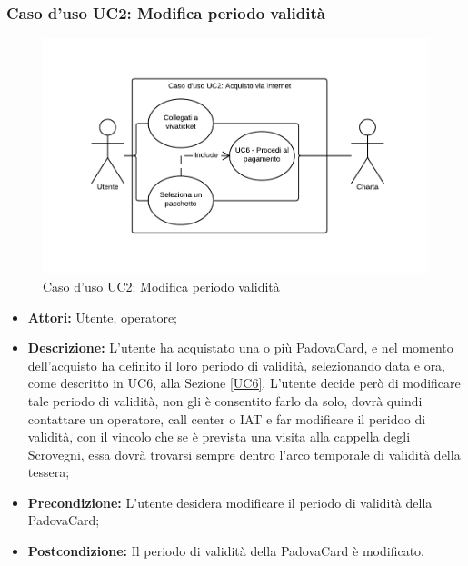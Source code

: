 \subsubsection{Caso d'uso UC2: Modifica periodo validità}
\begin{figure}[H]
\centering
\includegraphics[width=1\textwidth]{images/UC2.png}
\caption{Caso d'uso UC2: Modifica periodo validità}
\end{figure}
\begin{itemize}
\item \textbf{Attori:} Utente, operatore;
\item \textbf{Descrizione:} L'utente ha acquistato una o più PadovaCard, e nel momento dell'acquisto ha definito il loro periodo di validità, selezionando data e ora, come descritto in UC6, alla Sezione \ref{UC6}. L'utente decide però di modificare tale periodo di validità, non gli è consentito farlo da solo, dovrà quindi contattare un operatore, call center o IAT e far modificare il peridoo di validità, con il vincolo che se è prevista una visita alla cappella degli Scrovegni, essa dovrà trovarsi sempre dentro l'arco temporale di validità della tessera;
\item \textbf{Precondizione:} L'utente desidera modificare il periodo di validità della PadovaCard;
\item \textbf{Postcondizione:}  Il periodo di validità della PadovaCard è modificato.
\end{itemize}


